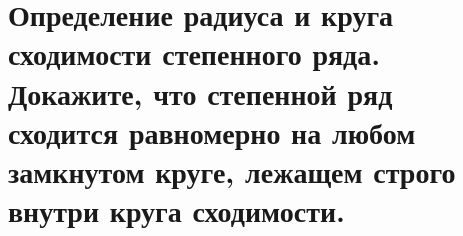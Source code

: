 \section{Определение радиуса и круга сходимости степенного ряда. Докажите, что степенной ряд сходится равномерно на любом замкнутом круге, лежащем строго внутри круга сходимости.}